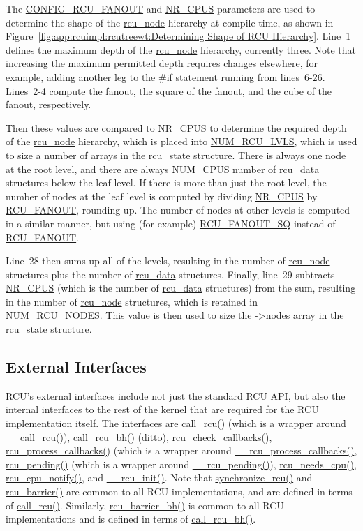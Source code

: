 The \url{CONFIG_RCU_FANOUT} and \url{NR_CPUS} parameters are used to
determine the shape of the \url{rcu_node} hierarchy at compile time,
as shown in
Figure~\ref{fig:app:rcuimpl:rcutreewt:Determining Shape of RCU Hierarchy}.
Line~1 defines the maximum depth of the \url{rcu_node} hierarchy,
currently three.
Note that increasing the maximum permitted depth requires changes
elsewhere, for example, adding another leg to the \url{#if}
statement running from lines~6-26.
Lines~2-4 compute the fanout, the square of the fanout, and the cube
of the fanout, respectively.

Then these values are compared to \url{NR_CPUS} to determine the required
depth of the \url{rcu_node} hierarchy, which is placed into
\url{NUM_RCU_LVLS}, which is used to size a number of arrays
in the \url{rcu_state} structure.
There is always one node at the root level, and there are always
\url{NUM_CPUS} number of \url{rcu_data} structures below the leaf
level.
If there is more than just the root level, the number of nodes at
the leaf level is computed
by dividing \url{NR_CPUS} by \url{RCU_FANOUT}, rounding up.
The number of nodes at other levels is computed in a similar manner,
but using (for example) \url{RCU_FANOUT_SQ} instead of \url{RCU_FANOUT}.

Line~28 then sums up all of the levels, resulting in the number of
\url{rcu_node} structures plus the number of \url{rcu_data} structures.
Finally, line~29 subtracts \url{NR_CPUS} (which is the number of
\url{rcu_data} structures) from the sum, resulting in the number
of \url{rcu_node} structures, which is retained in
\url{NUM_RCU_NODES}.
This value is then used to size the \url{->nodes} array in the
\url{rcu_state} structure.

\subsection{External Interfaces}
\label{app:rcuimpl:rcutreewt:External Interfaces}

RCU's external interfaces include not just the standard RCU API,
but also the internal interfaces to the rest of the kernel that
are required for the RCU implementation itself.
The interfaces are
\url{call_rcu()} (which is a wrapper around
\url{__call_rcu()}),
\url{call_rcu_bh()} (ditto),
\url{rcu_check_callbacks()},
\url{rcu_process_callbacks()} (which is a wrapper around
\url{__rcu_process_callbacks()},
\url{rcu_pending()} (which is a wrapper around
\url{__rcu_pending()}),
\url{rcu_needs_cpu()},
\url{rcu_cpu_notify()}, and
\url{__rcu_init()}.
Note that \url{synchronize_rcu()} and \url{rcu_barrier()} are
common to all RCU implementations, and are defined in terms of
\url{call_rcu()}.
Similarly, \url{rcu_barrier_bh()} is common to all RCU implementations
and is defined in terms of \url{call_rcu_bh()}.

